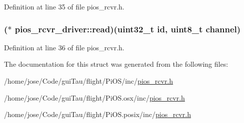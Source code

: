 Definition at line 35 of file pios\-\_\-rcvr.\-h.

\hypertarget{structpios__rcvr__driver_aece490b76542b52a499fe333f933372e}{
\subsubsection[{read}]{($\ast$ pios\-\_\-rcvr\-\_\-driver\-::read)({\bf uint32\-\_\-t} {\bf id}, {\bf uint8\-\_\-t} channel)}}\label{structpios__rcvr__driver_aece490b76542b52a499fe333f933372e}


Definition at line 36 of file pios\-\_\-rcvr.\-h.



The documentation for this struct was generated from the following files\-:\begin{DoxyCompactItemize}
\item 
/home/jose/\-Code/gui\-Tau/flight/\-Pi\-O\-S/inc/\hyperlink{inc_2pios__rcvr_8h}{pios\-\_\-rcvr.\-h}\item 
/home/jose/\-Code/gui\-Tau/flight/\-Pi\-O\-S.\-osx/inc/\hyperlink{osx_2inc_2pios__rcvr_8h}{pios\-\_\-rcvr.\-h}\item 
/home/jose/\-Code/gui\-Tau/flight/\-Pi\-O\-S.\-posix/inc/\hyperlink{posix_2inc_2pios__rcvr_8h}{pios\-\_\-rcvr.\-h}\end{DoxyCompactItemize}
